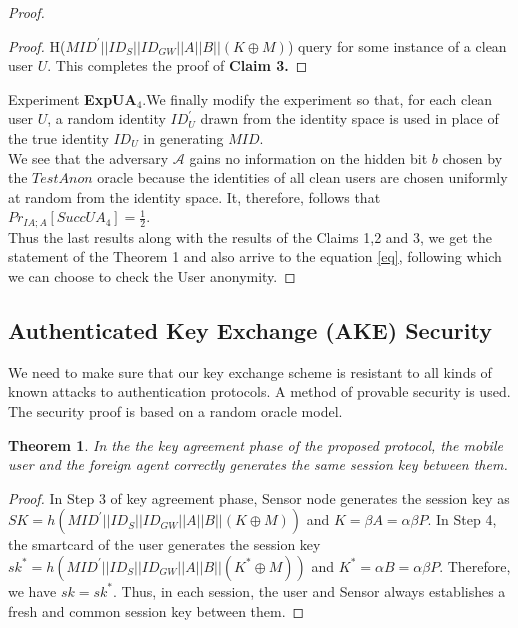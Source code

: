\documentclass[a4paper,12pt]{report}
\newtheorem{theorem}{Theorem}
\begin{document}
\begin{proof}
\begin{proof}
H($MID^{\prime}||ID_S||ID_{GW}||A||B||(K \oplus M)$) query for some
instance of a clean user $U$. This completes the proof of
\textbf{Claim 3.}
\end{proof}
Experiment \textbf{ExpUA$_4$}.We finally modify the experiment so
that, for each clean user $U$, a random identity $ID^{\prime}_U$
drawn from the identity space is used in place of the true identity
$ID_U$ in generating $MID$.\\We see that the adversary $\mathcal{A}$
gains no information on the hidden bit $b$ chosen by the $TestAnon$
oracle because the identities of all clean users are chosen
uniformly at random
from the identity space. It, therefore, follows that $Pr_{IA;A}[SuccUA_4] = \frac{1}{2}.$\\
\linebreak
Thus the last results along with the results of the Claims 1,2 and 3, we get the statement of the Theorem 1 and also arrive to the equation \ref{eq}, following which we can choose to check the User anonymity.
\end{proof}

\subsection{Authenticated Key Exchange (AKE) Security}
We need to make sure that our key exchange scheme is resistant to all kinds of known attacks to authentication protocols. A method of provable security is used. The security proof is based on a random oracle model.\cite{bellare}
\begin{theorem}
In the the key agreement phase of the proposed protocol, the mobile user
and the foreign agent correctly generates the same session key between them.
\end{theorem}
\begin{proof}
In Step 3 of key agreement phase, Sensor node generates the session key as $SK=
h(MID^{\prime}||ID_S||ID_{GW}||A||B||(K\oplus M))$ and $K =  \beta A = \alpha \beta P $. In Step 4, the smartcard of the user generates the session key $sk^* = h(MID^{\prime}||ID_S||ID_{GW}||A||B||(K^* \oplus M))$ and $K^* =  \alpha B = \alpha \beta P $. Therefore,
we have $sk = sk^*$. Thus, in each session, the user and Sensor always establishes a fresh
and common session key between them.
\end{proof}
\end{document}
